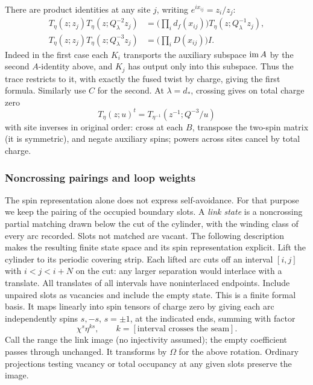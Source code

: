 There are product identities at any site \(j\), writing \(e^{ix_{ij}}=z_i/z_j\):
\[
 \begin{aligned}
 T_\eta(z;z_j)T_\eta(z;Q_\lambda^{-2}z_j)
   &=\Big(\prod_i d_f(x_{ij})\Big)T_\eta(z;Q_\lambda^{-1}z_j),\\
 T_\eta(z;z_j)T_\eta(z;Q_\lambda^{-3}z_j)&=\Big(\prod_i D(x_{ij})\Big) I .
 \end{aligned}
\]
Indeed in the first case each \(K_i\) transports the auxiliary subspace \({\rm im}\,A\) by the second \(A\)-identity above, and \(K_j\) has output only into this subspace. Thus the trace restricts to it, with exactly the fused twist by charge, giving the first formula. Similarly use \(C\) for the second. At \(\lambda=d_*\), crossing gives on total charge zero
\[
 T_\eta(z;u)^t=T_{\eta^{-1}}(z^{-1};Q^{-3}/u)
\]
with site inverses in original order: cross at each \(B\), transpose the two-spin matrix (it is symmetric), and negate auxiliary spins; powers across sites cancel by total charge.

\subsubsection{Noncrossing pairings and loop weights}

The spin representation alone does not express self-avoidance. For that
purpose we keep the pairing of the occupied boundary slots. A
\emph{link state} is a noncrossing partial matching drawn below the cut of
the cylinder, with the winding class of every arc recorded. Slots not
matched are vacant. The following description makes the resulting
finite state space and its spin representation explicit. Lift the cylinder
to its periodic covering strip. Each lifted arc cuts off an interval \([i,j]\) with \(i<j<i+N\) on the cut: any larger separation would interlace with a translate. All translates of all intervals have noninterlaced endpoints. Include unpaired slots as vacancies and include the empty state. This is a finite formal basis. It maps linearly into spin tensors of charge zero by giving each arc independently spins \(s,-s\), \(s=\pm1\), at the indicated ends, summing with factor
\[
 \chi^s \eta^{k s},\qquad k=[\text{interval crosses the seam}].
\]
Call the range the link image (no injectivity assumed); the empty coefficient passes through unchanged. It transforms by \(\Omega\) for the above rotation. Ordinary projections testing vacancy or total occupancy at any given slots preserve the image.

